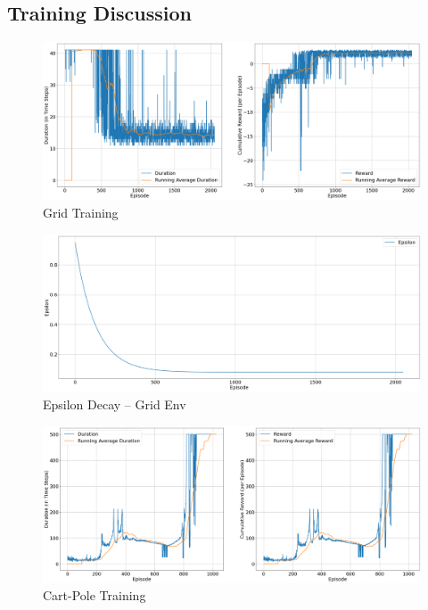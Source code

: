 \documentclass{article} %
\begin{document}
\subsection{Training Discussion}

\begin{figure}[H]
    \begin{center}
        \includegraphics[width=\textwidth]{grid_training_ddqn.png}
    \end{center}
    \caption{Grid Training}
\end{figure}

\begin{figure}[H]
    \begin{center}
        \includegraphics[width=\textwidth]{eps_grid_ddqn.png}
    \end{center}
    \caption{Epsilon Decay -- Grid Env}
\end{figure}

\begin{figure}[H]
    \begin{center}
        \includegraphics[width=\textwidth]{cart_training.png}
    \end{center}
    \caption{Cart-Pole Training}
\end{figure}
\end{document}
